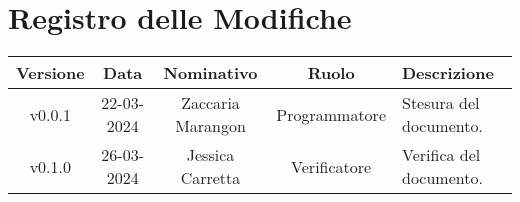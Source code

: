 \section*{\Large Registro delle Modifiche}
    \begin{table}[h]
        \centering
        \renewcommand\tabularxcolumn[1]{m{#1}} %
        \renewcommand{\arraystretch}{1.5}
        \begin{tabularx}{0.98\textwidth}
            {c|c|c|c|>{\centering\arraybackslash}X}
            \rowcolor{black}
            \textbf{\color{white} Versione} & \textbf{\color{white} Data} & \textbf{\color{white} Nominativo} & \textbf{\color{white} Ruolo} & \textbf{\color{white} Descrizione} \\ 
            \hline

            v0.0.1 & 22-03-2024 & Zaccaria Marangon & Programmatore & Stesura del documento.\\
            v0.1.0 & 26-03-2024 & Jessica Carretta & Verificatore & Verifica del documento.\\
            
           
            \hline
        \end{tabularx}
    \end{table}